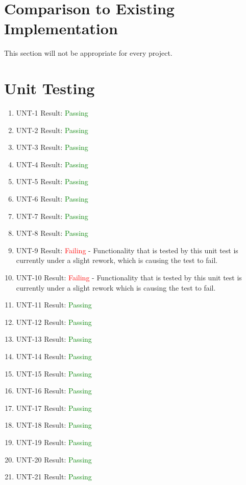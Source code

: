 \documentclass[12pt, titlepage]{article}
\begin{document}
	
\section{Comparison to Existing Implementation}	

This section will not be appropriate for every project.

\section{Unit Testing}

\begin{enumerate}
  \item UNT-1
  Result: \textcolor{green}{Passing} 
  \item UNT-2
  Result: \textcolor{green}{Passing}
  \item UNT-3
  Result: \textcolor{green}{Passing}
  \item UNT-4
  Result: \textcolor{green}{Passing} 
  \item UNT-5
  Result: \textcolor{green}{Passing}
  \item UNT-6
  Result: \textcolor{green}{Passing} 
  \item UNT-7
  Result: \textcolor{green}{Passing}
  \item UNT-8
  Result: \textcolor{green}{Passing}
  \item UNT-9
  Result: \textcolor{red}{Failing} - Functionality that is tested by this unit test is currently under a slight rework, which is causing the test to fail.
  \item UNT-10
  Result: \textcolor{red}{Failing} - Functionality that is tested by this unit test is currently under a slight rework which is causing the test to fail.
  \item UNT-11
  Result: \textcolor{green}{Passing}
  \item UNT-12
  Result: \textcolor{green}{Passing} 
  \item UNT-13
  Result: \textcolor{green}{Passing}
  \item UNT-14
  Result: \textcolor{green}{Passing}
  \item UNT-15
  Result: \textcolor{green}{Passing} 
  \item UNT-16
  Result: \textcolor{green}{Passing}
  \item UNT-17
  Result: \textcolor{green}{Passing}
  \item UNT-18
  Result: \textcolor{green}{Passing} 
  \item UNT-19
  Result: \textcolor{green}{Passing}
  \item UNT-20
  Result: \textcolor{green}{Passing}
  \item UNT-21
  Result: \textcolor{green}{Passing}
\end{enumerate}
\end{document}
